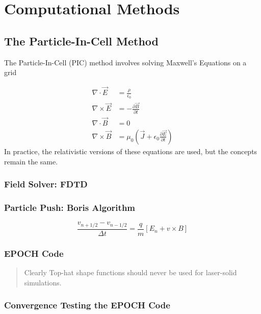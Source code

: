 \chapter{Computational Methods} \label{ch:3}

\section{The Particle-In-Cell Method}

The Particle-In-Cell (PIC) method involves solving Maxwell's Equations on a grid 

\begin{align}
	\nabla \cdot \vec{E} &= \frac{\rho}{\epsilon_0}  \label{eq:gauss} \\
	\nabla \times \vec{E} &= - \frac{\partial \vec{B}}{\partial t} \label{eq:faraday} \\
	\nabla \cdot \vec{B} &= 0 \\
	\nabla \times \vec{B} &= \mu_0 (\vec{J} + \epsilon_0 \frac{\partial \vec{E}}{\partial t}) \label{eq:ampere}
\end{align}
In practice, the relativistic versions of these equations are used, but the concepts remain the same. 

\subsection{Field Solver: FDTD}

\subsection{Particle Push: Boris Algorithm}

\begin{equation}
	\frac{v_{n + 1/2} - v_{n - 1/2}}{\Delta t} = \frac{q}{m}[E_n + v \times B]
\end{equation}

\subsection{EPOCH Code}

\begin{quote}
	Clearly Top-hat shape functions should never be used for laser-solid simulations.
\end{quote}

\subsection{Convergence Testing the EPOCH Code}


